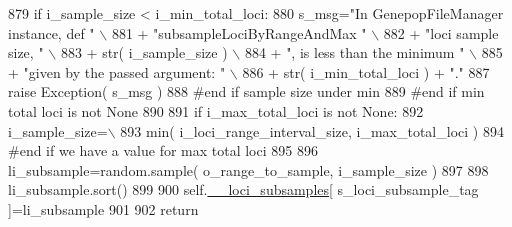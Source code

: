 \begin{DoxyCode}
879             \textcolor{keywordflow}{if} i\_sample\_size < i\_min\_total\_loci:
880                 s\_msg=\textcolor{stringliteral}{"In GenepopFileManager instance, def "} \(\backslash\)
881                             + \textcolor{stringliteral}{"subsampleLociByRangeAndMax "} \(\backslash\)
882                             + \textcolor{stringliteral}{"loci sample size, "} \(\backslash\)
883                             + str( i\_sample\_size )  \(\backslash\)
884                             + \textcolor{stringliteral}{", is less than the minimum "} \(\backslash\)
885                             + \textcolor{stringliteral}{"given by the passed argument: "}  \(\backslash\)
886                             + str( i\_min\_total\_loci ) + \textcolor{stringliteral}{"."}
887                 \textcolor{keywordflow}{raise} Exception( s\_msg )
888             \textcolor{comment}{#end if sample size under min}
889         \textcolor{comment}{#end if min total loci is not None}
890 
891         \textcolor{keywordflow}{if} i\_max\_total\_loci \textcolor{keywordflow}{is} \textcolor{keywordflow}{not} \textcolor{keywordtype}{None}:
892             i\_sample\_size=\(\backslash\)
893                     min( i\_loci\_range\_interval\_size, i\_max\_total\_loci ) 
894         \textcolor{comment}{#end if we have a value for max total loci }
895 
896         li\_subsample=random.sample( o\_range\_to\_sample, i\_sample\_size )
897 
898         li\_subsample.sort()
899 
900         self.\hyperlink{classnegui_1_1genepopfilemanager_1_1GenepopFileManager_af867ba70728e8a3aaf0097ddd6399e28}{\_\_loci\_subsamples}[ s\_loci\_subsample\_tag ]=li\_subsample
901 
902         \textcolor{keywordflow}{return}
\end{DoxyCode}
